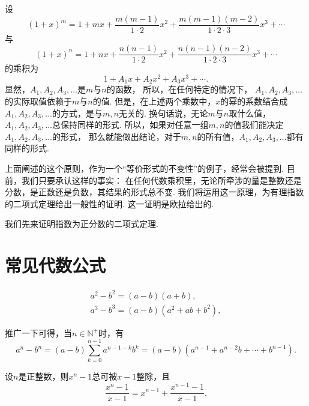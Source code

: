 设\begin{equation*}
	(1+x)^m
	= 1 + mx + \frac{m(m-1)}{1\cdot2}x^2
	+ \frac{m(m-1)(m-2)}{1\cdot2\cdot3}x^3
	+ \dotsb
\end{equation*}与\begin{equation*}
	(1+x)^n
	= 1 + nx + \frac{n(n-1)}{1\cdot2}x^2
	+ \frac{n(n-1)(n-2)}{1\cdot2\cdot3}x^3
	+ \dotsb
\end{equation*}的乘积为\begin{equation*}
	1 + A_1 x + A_2 x^2 + A_3 x^3 + \dotsb.
\end{equation*}
显然，\(A_1,A_2,A_3,\dotsc\)是\(m\)与\(n\)的函数，
所以，在任何特定的情况下，
\(A_1,A_2,A_3,\dotsc\)的实际取值依赖于\(m\)与\(n\)的值.
但是，在上述两个乘数中，\(x\)的幂的系数结合成\(A_1,A_2,A_3,\dotsc\)的方式，是与\(m,n\)无关的.
换句话说，无论\(m\)与\(n\)取什么值，\(A_1,A_2,A_3,\dotsc\)总保持同样的形式.
所以，如果对任意一组\(m,n\)的值我们能决定\(A_1,A_2,A_3,\dotsc\)的形式，
那么就能做出结论，对于\(m,n\)的所有值，\(A_1,A_2,A_3,\dotsc\)都有同样的形式.

上面阐述的这个原则，作为一个“等价形式的不变性”的例子，经常会被提到.
目前，我们只要承认这样的事实：
在任何代数乘积里，无论所牵涉的量是整数还是分数，是正数还是负数，其结果的形式总不变.
我们将运用这一原理，为有理指数的二项式定理给出一般性的证明.
这一证明是欧拉给出的.

我们先来证明指数为正分数的二项式定理.

\section{常见代数公式}

\begin{theorem}
\begin{gather*}
	a^2 - b^2 = (a-b)(a+b), \\
	a^3 - b^3 = (a-b)(a^2+ab+b^2),
\end{gather*}

推广一下可得，当\(n \in \mathbb{N}^+\)时，有\begin{equation*}
	a^n - b^n = (a-b) \sum_{k=0}^{n-1}{a^{n-1-k} b^k}
	= (a-b)(a^{n-1} + a^{n-2} b + \dotsb + b^{n-1}).
\end{equation*}
\end{theorem}

设\(n\)是正整数，则\(x^n-1\)总可被\(x-1\)整除，且\begin{equation*}
	\frac{x^n-1}{x-1}
	= x^{n-1} + \frac{x^{n-1}-1}{x-1}.
\end{equation*}

